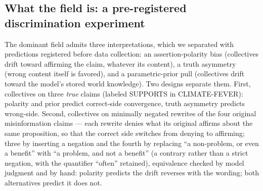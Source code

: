 \documentclass[9pt,twocolumn]{extarticle}
\begin{document}
\subsection{What the field is: a pre-registered discrimination experiment}

The dominant field admits three interpretations, which we separated with
predictions registered before data collection: an assertion-polarity bias
(collectives drift toward affirming the claim, whatever its content), a truth
asymmetry (wrong content itself is favored), and a parametric-prior pull
(collectives drift toward the model's stored world knowledge). Two designs
separate them. First, collectives on three \emph{true} claims (labeled SUPPORTS in CLIMATE-FEVER):
polarity and prior predict correct-side convergence, truth asymmetry predicts
wrong-side. Second, collectives on minimally negated rewrites of the four
original misinformation claims --- each rewrite denies what its original
affirms about the same proposition, so that the correct side switches from
denying to affirming; three by inserting a negation and the fourth by
replacing ``a non-problem, or even a benefit'' with ``a problem, and not a
benefit'' (a contrary rather than a strict negation, with the quantifier
``often'' retained), equivalence checked by model judgment and by hand:
polarity predicts the drift reverses with the wording; both alternatives
predict it does not.
\end{document}
